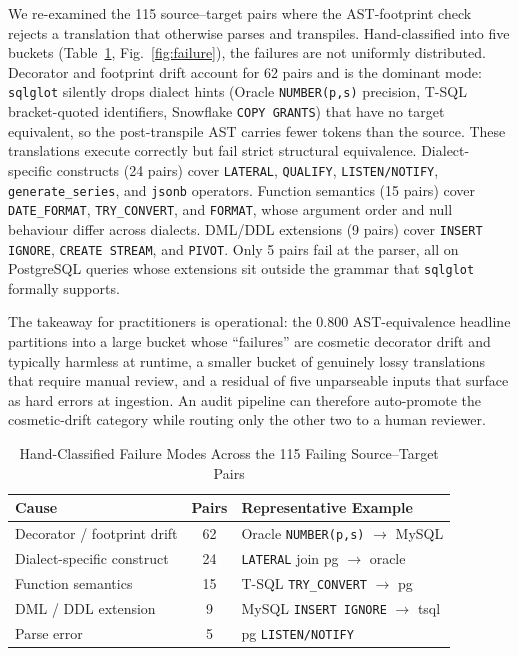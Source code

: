 \documentclass{ieeeaccess}
\begin{document}
We re-examined the 115 source--target pairs where the AST-footprint check rejects
a translation that otherwise parses and transpiles. Hand-classified into five
buckets (Table~\ref{tab:failure}, Fig.~\ref{fig:failure}), the failures are not
uniformly distributed. Decorator and footprint drift account for 62 pairs and is
the dominant mode: \texttt{sqlglot} silently drops dialect hints (Oracle
\texttt{NUMBER(p,s)} precision, T-SQL bracket-quoted identifiers, Snowflake
\texttt{COPY GRANTS}) that have no target equivalent, so the post-transpile AST
carries fewer tokens than the source. These translations execute correctly but
fail strict structural equivalence. Dialect-specific constructs (24 pairs) cover
\texttt{LATERAL}, \texttt{QUALIFY}, \texttt{LISTEN/NOTIFY},
\texttt{generate\_series}, and \texttt{jsonb} operators. Function semantics
(15 pairs) cover \texttt{DATE\_FORMAT}, \texttt{TRY\_CONVERT}, and \texttt{FORMAT},
whose argument order and null behaviour differ across dialects. DML/DDL extensions
(9 pairs) cover \texttt{INSERT IGNORE}, \texttt{CREATE STREAM}, and \texttt{PIVOT}.
Only 5 pairs fail at the parser, all on PostgreSQL queries whose extensions sit
outside the grammar that \texttt{sqlglot} formally supports.

The takeaway for practitioners is operational: the 0.800 AST-equivalence headline
partitions into a large bucket whose ``failures'' are cosmetic decorator drift and
typically harmless at runtime, a smaller bucket of genuinely lossy translations
that require manual review, and a residual of five unparseable inputs that surface
as hard errors at ingestion. An audit pipeline can therefore auto-promote the
cosmetic-drift category while routing only the other two to a human reviewer.

\begin{table}[tbp]
\centering
\caption{Hand-Classified Failure Modes Across the 115 Failing Source--Target Pairs}
\label{tab:failure}
\footnotesize
\setlength{\tabcolsep}{3pt}
\begin{tabularx}{\columnwidth}{|>{\raggedright\arraybackslash}X|c|>{\raggedright\arraybackslash}X|}
\hline
\textbf{Cause} & \textbf{Pairs} & \textbf{Representative Example} \\
\hline
Decorator / footprint drift & 62 & Oracle \texttt{NUMBER(p,s)} $\rightarrow$ MySQL \\ \hline
Dialect-specific construct  & 24 & \texttt{LATERAL} join pg $\rightarrow$ oracle \\ \hline
Function semantics          & 15 & T-SQL \texttt{TRY\_CONVERT} $\rightarrow$ pg \\ \hline
DML / DDL extension         & 9  & MySQL \texttt{INSERT IGNORE} $\rightarrow$ tsql \\ \hline
Parse error                 & 5  & pg \texttt{LISTEN/NOTIFY} \\ \hline
\end{tabularx}
\end{table}
\end{document}
